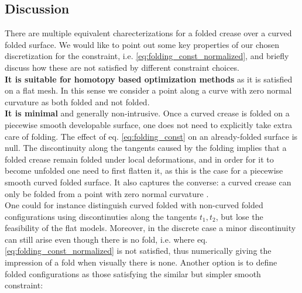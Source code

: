 

\subsection{Discussion}
There are multiple equivalent charecterizations for a folded crease over a curved folded surface. We would like to point out some key properties of our chosen discretization for the constraint, i.e. \eqref{eq:folding_const_normalized}, and briefly discuss how these are not satisfied by different constraint choices. \\
\textbf{It is suitable for homotopy based optimization methods} as it is satisfied on a flat mesh. In this sense we consider a point along a curve with zero normal curvature as both folded and not folded. \\ 
\textbf{It is minimal} and generally non-intrusive. Once a curved crease is folded on a piecewise smooth developable surface, one does not need to explicitly take extra care of folding. The effect of eq. \eqref{eq:folding_const} on an already-folded surface is null. The discontinuity along the tangents caused by the folding implies that a folded crease remain folded under local deformations, and in order for it to become unfolded one need to first flatten it, as this is the case for a piecewise smooth curved folded surface. It also captures the converse: a curved crease can only be folded from a point with zero normal curvature \cite{more_on_paper}. \\
One could for instance distinguish curved folded with non-curved folded configurations using discontinuties along the tangents $t_1,t_2$, but lose the feasibility of the flat models. Moreover, in the discrete case a minor discontinuity can still arise even though there is no fold, i.e. where eq. \eqref{eq:folding_const_normalized} is not satisfied, thus numerically giving the impression of a fold when visually there is none. Another option is to define folded configurations as those satisfying the similar but simpler smooth constraint:

